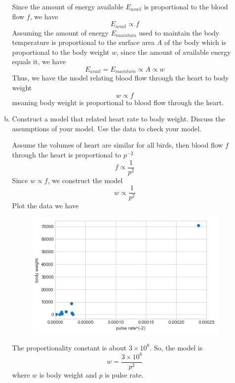 \documentclass[10pt]{report}
\begin{document}
\begin{enumerate}
\begin{enumerate}[a.]
		Since the amount of energy available $E_{avail}$ is proportional to the blood flow $f$, we have
		\[
		E_{avail} \propto f
		\]
		Assuming the amount of energy $E_{maintain}$ used to maintain the body temperature is proportional to the surface area $A$ of the body which is proportional to the body weight $w$, since the amount of available energy equals it, we have
		\[
		E_{avail} = E_{maintain} \propto A \propto w
		\]
		Thus, we have the model relating blood flow through the heart to body weight
		\[
		w \propto f
		\]
		meaning body weight is proportional to blood flow through the heart.
		
		\item 
		Construct a model that related heart rate to body weight. Discuss the assumptions of your model. Use the data to check your model.
		
		Assume the volumes of heart are similar for all birds, then blood flow $f$ through the heart is proportional to $p^{-2}$
		\[
		f \propto \frac{1}{p^2}
		\]
		Since $w \propto f$, we construct the model
		\[
		w \propto \frac{1}{p^2}
		\]
		Plot the data we have
		\begin{figure}[H]
			\centering
			\includegraphics[width=0.5\linewidth]{s2_3/b.png}
		\end{figure}
		The proportionality constant is about $3\times 10^8$. So, the model is
		\[
		w = \frac{3\times 10^8}{p^2}
		\]
		where $w$ is body weight and $p$ is pulse rate.
	\end{enumerate}
\end{enumerate}
\end{document}

